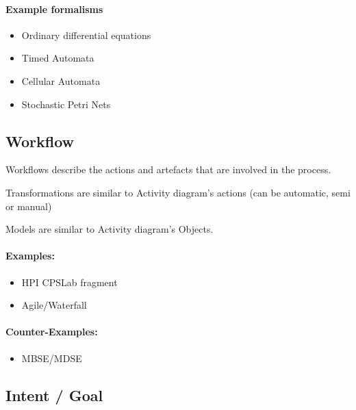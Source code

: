 \paragraph{Example formalisms}
\begin{itemize}
    \item Ordinary differential equations
    \item Timed Automata
    \item Cellular Automata
    \item Stochastic Petri Nets
\end{itemize}


\subsection{Workflow}
\label{sec:Workflow}
Workflows describe the actions and artefacts that are involved in the process.

Transformations are similar to Activity diagram's actions (can be automatic, semi or manual)

Models are similar to Activity diagram's Objects.

\paragraph{Examples:}


\begin{itemize}
    \item HPI CPSLab fragment
    \item Agile/Waterfall
\end{itemize}

\paragraph{Counter-Examples:}
\begin{itemize}
    \item MBSE/MDSE
\end{itemize}


\subsection{Intent / Goal}
\label{sec:Intent-Goal}

